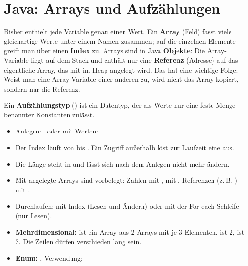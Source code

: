 \section{Java: Arrays und Aufzählungen}
\worum
Bisher enthielt jede Variable genau einen Wert. Ein \textbf{Array} (Feld) fasst viele gleichartige Werte unter einem Namen zusammen; auf die einzelnen Elemente greift man über einen \textbf{Index} zu. Arrays sind in Java \textbf{Objekte}: Die Array-Variable liegt auf dem Stack und enthält nur eine \textbf{Referenz} (Adresse) auf das eigentliche Array, das mit  im Heap angelegt wird. Das hat eine wichtige Folge: Weist man eine Array-Variable einer anderen zu, wird nicht das Array kopiert, sondern nur die Referenz.

Ein \textbf{Aufzählungstyp} () ist ein Datentyp, der als Werte nur eine feste Menge benannter Konstanten zulässt.

\begin{merke}
\begin{itemize}[itemsep=0.1em]
\item Anlegen:  \ oder mit Werten: \ 
\item Der Index läuft von  bis . Ein Zugriff außerhalb löst zur Laufzeit eine  aus.
\item Die Länge steht in  und lässt sich nach dem Anlegen nicht mehr ändern.
\item Mit  angelegte Arrays sind vorbelegt: Zahlen mit ,  mit , Referenzen (z.\,B. ) mit .
\item Durchlaufen: mit Index  (Lesen und Ändern) oder mit der For-each-Schleife  (nur Lesen).
\item \textbf{Mehrdimensional:}  ist ein Array aus 2 Arrays mit je 3 Elementen.  ist 2,  ist 3. Die Zeilen dürfen verschieden lang sein.
\item \textbf{Enum:} , Verwendung: 
\end{itemize}
\end{merke}

